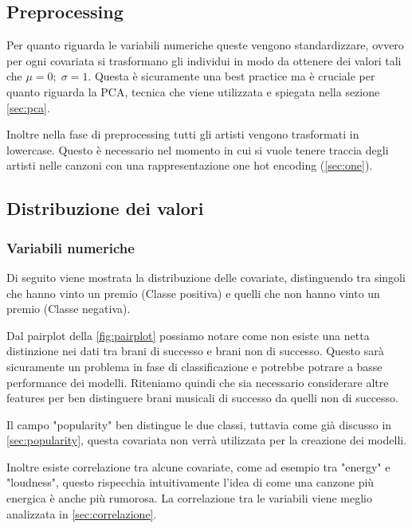 \subsection{Preprocessing}
Per quanto riguarda le variabili numeriche queste vengono
standardizzare, ovvero per ogni covariata si trasformano gli individui
in modo da ottenere dei valori tali che $\mu = 0;\; \sigma =
1$. Questa è sicuramente una best practice ma è cruciale per quanto
riguarda la PCA, tecnica che viene utilizzata e spiegata nella sezione
\autoref{sec:pca}.

Inoltre nella fase di preprocessing tutti gli artisti vengono
trasformati in lowercase. Questo è necessario nel momento in cui si
vuole tenere traccia degli artisti nelle canzoni con una
rappresentazione one hot encoding (\autoref{sec:one}).

\subsection{Distribuzione dei valori}
\subsubsection{Variabili numeriche}
Di seguito viene mostrata la distribuzione delle covariate,
distinguendo tra singoli che hanno vinto un premio (Classe positiva) e
quelli che non hanno vinto un premio (Classe negativa).

Dal pairplot della \autoref{fig:pairplot} possiamo notare come non
esiste una netta distinzione nei dati tra brani di successo e brani
non di successo. Questo sarà sicuramente un problema in fase di
classificazione e potrebbe potrare a basse performance dei
modelli. Riteniamo quindi che sia necessario considerare altre
features per ben distinguere brani musicali di successo da quelli non
di successo.

Il campo "popularity" ben distingue le due classi, tuttavia come già
discusso in \autoref{sec:popularity}, questa covariata non verrà
utilizzata per la creazione dei modelli.

Inoltre esiste correlazione tra alcune covariate, come ad esempio tra
"energy" e "loudness", questo rispecchia intuitivamente l'idea di come
una canzone più energica è anche più rumorosa. La correlazione tra le
variabili viene meglio analizzata in \autoref{sec:correlazione}.


